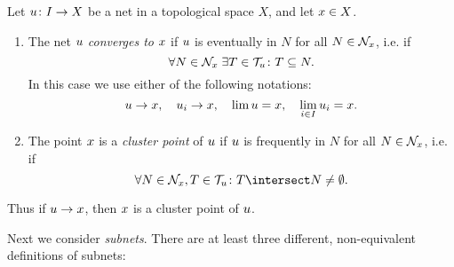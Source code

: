 \documentclass[article, a4paper, 11pt, oneside]{memoir}
\numberwithin{equation}{chapter}
\theoremstyle{nonumberplain}
\begin{document}
\begin{definition}
    Let $u \colon I \to X$ be a net in a topological space $X$, and let $x \in X$.
    \begin{enumerate}
        \item The net $u$ \emph{converges to $x$} if $u$ is eventually in $N$ for all $N \in \mathcal{N}_{x}$, i.e. if
        \begin{equation*}
            \forall N \in \mathcal{N}_{x} \; \exists T \in \mathcal{T}_{u} \colon T \subseteq N.
        \end{equation*}
        In this case we use either of the following notations:
        \begin{equation*}
            u \to x, \quad
            u_i \to x, \quad
            \lim u = x, \quad
            \lim_{i \in I} u_i = x.
        \end{equation*}

        \item The point $x$ is a \emph{cluster point} of $u$ if $u$ is frequently in $N$ for all $N \in \mathcal{N}_{x}$, i.e. if
        \begin{equation*}
            \forall N \in \nhoods{\mylimit}, T \in \tails{\mynet} \colon T \intersect N \neq \emptyset.
        \end{equation*}
    \end{enumerate}
\end{definition}
%
Thus if $u \to x$, then $x$ is a cluster point of $u$.

Next we consider \emph{subnets}. There are at least three different, non-equivalent definitions of subnets:
\end{document}
